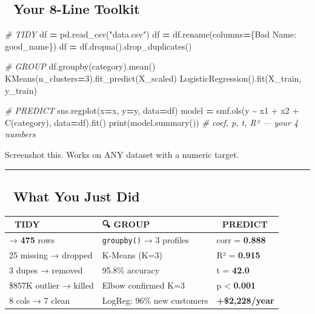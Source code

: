 \documentclass[
]{article}
\newenvironment{Shaded}{\begin{snugshade}}{\end{snugshade}}
\newcommand{\BuiltInTok}[1]{#1}
\newcommand{\CommentTok}[1]{\textcolor[rgb]{0.56,0.35,0.01}{\textit{#1}}}
\newcommand{\DecValTok}[1]{\textcolor[rgb]{0.00,0.00,0.81}{#1}}
\newcommand{\NormalTok}[1]{#1}
\newcommand{\OperatorTok}[1]{\textcolor[rgb]{0.81,0.36,0.00}{\textbf{#1}}}
\newcommand{\StringTok}[1]{\textcolor[rgb]{0.31,0.60,0.02}{#1}}
\begin{document}
\subsection{🧰 Your 8-Line Toolkit}\label{your-8-line-toolkit}

\begin{Shaded}
\begin{Highlighting}[]
\CommentTok{\# TIDY}
\NormalTok{df }\OperatorTok{=}\NormalTok{ pd.read\_csv(}\StringTok{"data.csv"}\NormalTok{)}
\NormalTok{df }\OperatorTok{=}\NormalTok{ df.rename(columns}\OperatorTok{=}\NormalTok{\{}\StringTok{\textquotesingle{}Bad Name\textquotesingle{}}\NormalTok{: }\StringTok{\textquotesingle{}good\_name\textquotesingle{}}\NormalTok{\})}
\NormalTok{df }\OperatorTok{=}\NormalTok{ df.dropna().drop\_duplicates()}

\CommentTok{\# GROUP}
\NormalTok{df.groupby(}\StringTok{\textquotesingle{}category\textquotesingle{}}\NormalTok{).mean()}
\NormalTok{KMeans(n\_clusters}\OperatorTok{=}\DecValTok{3}\NormalTok{).fit\_predict(X\_scaled)}
\NormalTok{LogisticRegression().fit(X\_train, y\_train)}

\CommentTok{\# PREDICT}
\NormalTok{sns.regplot(x}\OperatorTok{=}\StringTok{\textquotesingle{}x\textquotesingle{}}\NormalTok{, y}\OperatorTok{=}\StringTok{\textquotesingle{}y\textquotesingle{}}\NormalTok{, data}\OperatorTok{=}\NormalTok{df)}
\NormalTok{model }\OperatorTok{=}\NormalTok{ smf.ols(}\StringTok{\textquotesingle{}y \textasciitilde{} x1 + x2 + C(category)\textquotesingle{}}\NormalTok{, data}\OperatorTok{=}\NormalTok{df).fit()}
\BuiltInTok{print}\NormalTok{(model.summary())      }\CommentTok{\# coef, p, t, R² — your 4 numbers}
\end{Highlighting}
\end{Shaded}

Screenshot this. Works on ANY dataset with a numeric target.

\begin{center}\rule{0.5\linewidth}{0.5pt}\end{center}

\subsection{🎯 What You Just Did}\label{what-you-just-did}

\begin{longtable}[]{@{}lll@{}}
\toprule\noalign{}
🧹 TIDY & 🔍 GROUP & 🔮 PREDICT \\
\midrule\noalign{}
\endhead
\bottomrule\noalign{}
\endlastfoot
504 → \textbf{475} rows & \texttt{groupby()} → 3 profiles & corr =
\textbf{0.888} \\
25 missing → dropped & K-Means (K=3) & R² = \textbf{0.915} \\
3 dupes → removed & 95.8\% accuracy & t = \textbf{42.0} \\
\$857K outlier → killed & Elbow confirmed K=3 & p \textless{}
\textbf{0.001} \\
8 cols → 7 clean & LogReg: 96\% new customers &
\textbf{+\$2,228/year} \\
\end{longtable}
\end{document}
